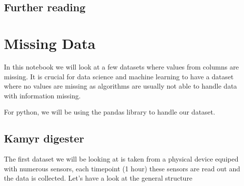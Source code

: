 \documentclass[letterpaper,10pt,english]{jupyterBook}
\begin{document}
\section{Further reading}
\label{\detokenize{c2_data_preparation/introduction:further-reading}}
\sphinxAtStartPar
{}


\chapter{Missing Data}
\label{\detokenize{c2_data_preparation/missing_data:missing-data}}\label{\detokenize{c2_data_preparation/missing_data::doc}}
\sphinxAtStartPar
In this notebook we will look at a few datasets where values from columns are missing.
It is crucial for data science and machine learning to have a dataset where no values are missing as algorithms are usually not able to handle data with information missing.

\sphinxAtStartPar
For python, we will be using the pandas library to handle our dataset.

\begin{sphinxVerbatim}[commandchars=\\\{\}]
   
\end{sphinxVerbatim}


\section{Kamyr digester}
\label{\detokenize{c2_data_preparation/missing_data:kamyr-digester}}
\sphinxAtStartPar
The first dataset we will be looking at is taken from a physical device equiped with numerous sensors, each timepoint (1 hour) these sensors are read out and the data is collected. Let’s have a look at the general structure

\begin{sphinxVerbatim}[commandchars=\\\{\}]
  
\end{sphinxVerbatim}
\end{document}
